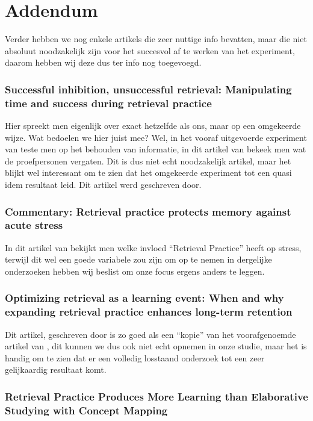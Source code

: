 \documentclass{hogent-article}
\begin{document}
\section{Addendum}

Verder hebben we nog enkele artikels die zeer nuttige info bevatten, maar die niet absoluut noodzakelijk zijn voor het succesvol af te werken van het experiment, daarom hebben wij deze dus ter info nog toegevoegd.

\subsubsection{Successful inhibition, unsuccessful retrieval: Manipulating time and success during retrieval practice}

Hier spreekt men eigenlijk over exact hetzelfde als ons, maar op een omgekeerde wijze. Wat bedoelen we hier juist mee? Wel, in het vooraf uitgevoerde experiment van \cite{HenryRoediger2006} teste men op het behouden van informatie, in dit artikel van \cite{BenjaminStorm2009} bekeek men wat de proefpersonen vergaten. Dit is dus niet echt noodzakelijk artikel, maar het blijkt wel interessant om te zien dat het omgekeerde experiment tot een quasi idem resultaat leid. Dit artikel werd geschreven door. 

\subsubsection{Commentary: Retrieval practice protects memory against acute stress}

In dit artikel van \cite{Smith2016} bekijkt men welke invloed ``Retrieval Practice'' heeft op stress, terwijl dit wel een goede variabele zou zijn om op te nemen in dergelijke onderzoeken hebben wij beslist om onze focus ergens anders te leggen.

\subsubsection{Optimizing retrieval as a learning event: When and why expanding retrieval practice enhances long-term retention}

Dit artikel, geschreven door \cite{Storm2010} is zo goed als een ``kopie'' van het voorafgenoemde artikel van \cite{HenryRoediger2006}, dit kunnen we dus ook niet echt opnemen in onze studie, maar het is handig om te zien dat er een volledig losstaand onderzoek tot een zeer gelijkaardig resultaat komt. 

\subsubsection{Retrieval Practice Produces More Learning than Elaborative Studying with Concept Mapping}
\end{document}
